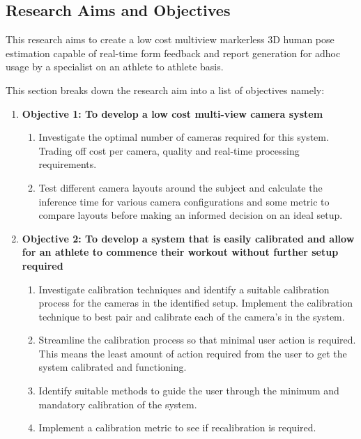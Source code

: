 \subsection{Research Aims and Objectives}
\label{sec:researchaimsandobjectives}

This research aims to create a low cost multiview markerless 3D human pose estimation capable of real-time form feedback and report generation for adhoc usage by a specialist on an athlete to athlete basis.

This section breaks down the research aim into a list of objectives namely:

\begin{enumerate}
    \item \textbf{Objective 1: To develop a low cost multi-view camera system}
        \begin{enumerate}
            \item Investigate the optimal number of cameras required for this system. Trading off cost per camera, quality and real-time processing requirements.
            \item Test different camera layouts around the subject and calculate the inference time for various camera configurations and some metric to compare layouts before making an informed decision on an ideal setup.
        \end{enumerate}
    
    \item \textbf{Objective 2: To develop a system that is easily calibrated and allow for an athlete to commence their workout without further setup required}
        \begin{enumerate}
            \item Investigate calibration techniques and identify a suitable calibration process for the cameras in the identified setup. Implement the calibration technique to best pair and calibrate each of the camera's in the system.
            \item Streamline the calibration process so that minimal user action is required. This means the least amount of action required from the user to get the system calibrated and functioning.
            \item Identify suitable methods to guide the user through the minimum and mandatory calibration of the system.
            \item Implement a calibration metric to see if recalibration is required.
        \end{enumerate}
        

\end{enumerate}
